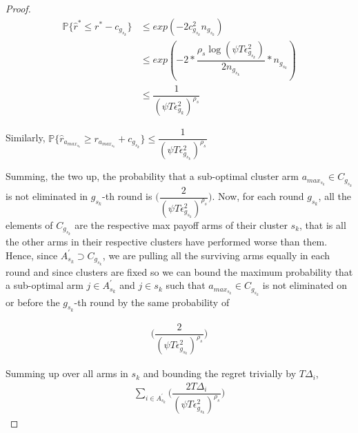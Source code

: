 \begin{proof}
 \begin{align*}
 \mathbb{P}\bigg\lbrace\hat{r}^{*} \leq r^{*} - c_{g_{s_{k}}}\bigg\rbrace&\leq exp(-2c_{g_{s_{k}}}^{2}n_{g_{s_{k}}})\\
 &\leq exp(-2 * \dfrac{\rho_{s}\log ( \psi T\epsilon_{g_{s_{k}}}^{2})}{2 n_{g_{s_{k}}}} *n_{g_{s_{k}}})\\
 &\leq \dfrac{1}{(\psi T\epsilon_{g_{k}}^{2})^{\rho_{s}}}
 \end{align*}

 
Similarly, $\mathbb{P}\bigg\lbrace\hat{r}_{a_{max_{s_{k}}}}\geq r_{a_{max_{s_{k}}}} + c_{g_{s_{k}}}\bigg\rbrace\leq \dfrac{1}{(\psi T\epsilon_{g_{s_{k}}}^{2})^{\rho_{s}}}$
 
Summing, the two up, the probability that a sub-optimal cluster arm $a_{max_{s_{k}}}\in C_{g_{s_{k}}}$ is not eliminated in $g_{s_{k}}$-th round is  $\bigg(\dfrac{2}{(\psi  T\epsilon_{g_{s_{k}}}^{2})^{\rho_{s}}}\bigg)$. 
  Now, for each round $g_{s_{k}}$, all the elements of $C_{g_{s_{k}}}$ are the respective max payoff arms of their cluster $s_{k}$, that is all the other arms in their respective clusters have performed worse than them. Hence, since $A_{s_{k}}^{'}\supset C_{g_{s_{k}}}$, we are pulling all the surviving arms equally in each round and since clusters are fixed so we can bound the maximum probability that a sub-optimal arm ${j}\in A^{'}_{s_{k}}$  and ${j}\in s_{k}$ such that $a_{max_{s_{k}}}\in C_{g_{s_{k}}}$ is not eliminated on or before the $g_{s_{k}}$-th round by the same probability of 
  
\begin{align*}
\bigg(\dfrac{2}{(\psi T\epsilon_{g_{s_{k}}}^{2})^{\rho_{s}}}\bigg)
\end{align*}  
 
 
Summing up over all arms in $s_{k}$ and bounding the regret trivially by $T\Delta_{i}$,
\begin{align*}
\sum_{i\in A_{s_{k}}^{'}}\bigg(\dfrac{2T\Delta_{i}}{(\psi T\epsilon_{g_{s_{k}}}^{2})^{\rho_{s}}}\bigg)
\end{align*}


\end{proof}

